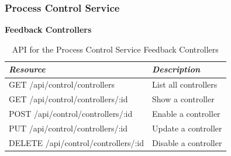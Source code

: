     \subsubsection{Process Control Service}\label{sec:rest-control}

      \large{\textbf{Feedback Controllers}}

      \begin{table}[H]
        \centering
        \begin{tabular}{p{3in} p{3in}}
          \toprule
          \emph{Resource} & \emph{Description} \\ [0.5ex]
          \midrule
          GET /api/control/controllers & List all controllers \\
          GET /api/control/controllers/:id & Show a controller \\
          POST /api/control/controllers/:id & Enable a controller \\
          PUT /api/control/controllers/:id & Update a controller \\
          DELETE /api/control/controllers/:id & Disable a controller \\
          \bottomrule
        \end{tabular}
        \caption{API for the Process Control Service Feedback Controllers}\label{tab:rest-control-controllers}
      \end{table}
